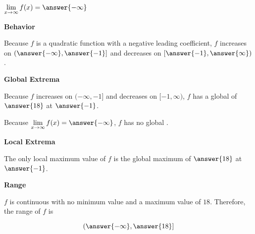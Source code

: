 \documentclass{ximera}
\begin{document}
\begin{exercise}
\begin{question}
$\lim\limits_{x \to \infty} f(x) = \answer{-\infty}$ \\

\end{question}




\begin{question}  \textbf{\textcolor{blue!55!black}{Behavior}}



Because $f$ is a quadratic function with a negative leading coefficient, $f$ increases on $\left( \answer{-\infty}, \answer{-1} \right]$ and decreases on $\left[ \answer{-1}, \answer{\infty} \right)$. 

\end{question}









\begin{question}  \textbf{\textcolor{blue!55!black}{Global Extrema}}

Because $f$ increases on $( -\infty, -1 ]$ and decreases on $[ -1, \infty )$, $f$ has a global   of $\answer{18}$ at $\answer{-1}$.



Because $\lim\limits_{x \to \infty} f(x) = \answer{-\infty}$, $f$ has no global .

\end{question}












\begin{question}  \textbf{\textcolor{blue!55!black}{Local Extrema}}

The only local maximum value of $f$ is the global maximum of $\answer{18}$ at $\answer{-1}$.

\end{question}







\begin{question}  \textbf{\textcolor{blue!55!black}{Range}}

$f$ is continuous with no minimum value and a maximum value of $18$.  Therefore, the range of $f$ is

\[
\left( \answer{-\infty}, \answer{18} \right]
\]

\end{question}


\end{exercise}
\end{document}
